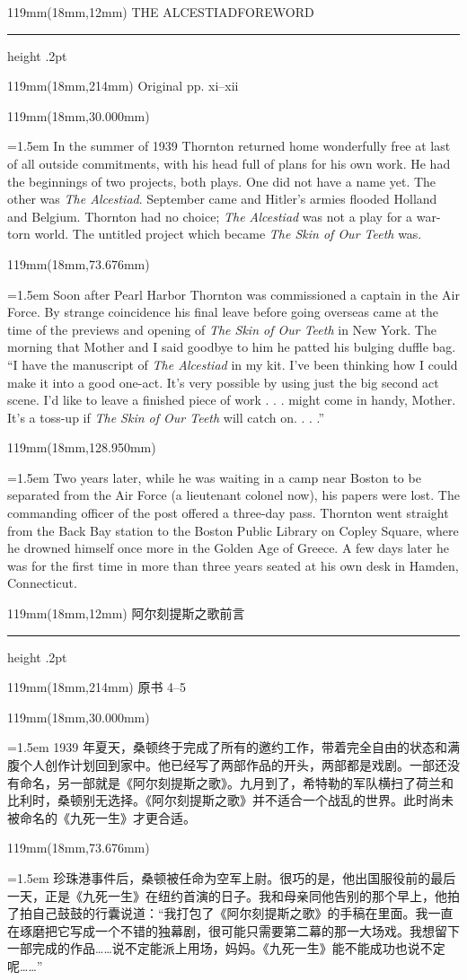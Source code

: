 \documentclass{article}
\newcommand{\ENsetup}{\normalfont\color{ink}\fontsize{11}{16.5}\selectfont\emergencystretch=1.5em}
\newcommand{\ZHsetup}{\normalfont\color{ink}\fontsize{10.5}{17}\selectfont\emergencystretch=1.5em}
\newcommand{\Block}[3]{\begin{textblock*}{119mm}(18mm,#1mm){#2 #3\par}\end{textblock*}}
\newcommand{\Heading}[3]{%
  \begin{textblock*}{119mm}(18mm,12mm)
    \color{quiet}\fontsize{7.5}{10}\selectfont
    #1\hfill #2\par\vspace{3mm}\hrule height .2pt
  \end{textblock*}
  \begin{textblock*}{119mm}(18mm,214mm)
    \color{quiet}\fontsize{7}{10}\selectfont #3\hfill\thepage
  \end{textblock*}
}
\begin{document}
\newpage
\null
\Heading{THE ALCESTIAD}{FOREWORD}{Original pp. xi–xii}
\Block{30.000}{\ENsetup}{In the summer of 1939 Thornton returned home wonderfully free at last of all outside commitments, with his head full of plans for his own work. He had the beginnings of two projects, both plays. One did not have a name yet. The other was \textit{The Alcestiad}. September came and Hitler's armies flooded Holland and Belgium. Thornton had no choice; \textit{The Alcestiad} was not a play for a war-torn world. The untitled project which became \textit{The Skin of Our Teeth} was.\par}
\Block{73.676}{\ENsetup}{Soon after Pearl Harbor Thornton was commissioned a captain in the Air Force. By strange coincidence his final leave before going overseas came at the time of the previews and opening of \textit{The Skin of Our Teeth} in New York. The morning that Mother and I said goodbye to him he patted his bulging duffle bag. ``I have the manuscript of \textit{The Alcestiad} in my kit. I've been thinking how I could make it into a good one-act. It's very possible by using just the big second act scene. I'd like to leave a finished piece of work . . . might come in handy, Mother. It's a toss-up if \textit{The Skin of Our Teeth} will catch on. . . .''\par}
\Block{128.950}{\ENsetup}{Two years later, while he was waiting in a camp near Boston to be separated from the Air Force (a lieutenant colonel now), his papers were lost. The commanding officer of the post offered a three-day pass. Thornton went straight from the Back Bay station to the Boston Public Library on Copley Square, where he drowned himself once more in the Golden Age of Greece. A few days later he was for the first time in more than three years seated at his own desk in Hamden, Connecticut.\par}
\newpage
\null
\Heading{阿尔刻提斯之歌}{前言}{原书 4–5}
\Block{30.000}{\ZHsetup}{1939 年夏天，桑顿终于完成了所有的邀约工作，带着完全自由的状态和满腹个人创作计划回到家中。他已经写了两部作品的开头，两部都是戏剧。一部还没有命名，另一部就是《阿尔刻提斯之歌》。九月到了，希特勒的军队横扫了荷兰和比利时，桑顿别无选择。《阿尔刻提斯之歌》并不适合一个战乱的世界。此时尚未被命名的《九死一生》才更合适。\par }
\Block{73.676}{\ZHsetup}{珍珠港事件后，桑顿被任命为空军上尉。很巧的是，他出国服役前的最后一天，正是《九死一生》在纽约首演的日子。我和母亲同他告别的那个早上，他拍了拍自己鼓鼓的行囊说道：“我打包了《阿尔刻提斯之歌》的手稿在里面。我一直在琢磨把它写成一个不错的独幕剧，很可能只需要第二幕的那一大场戏。我想留下一部完成的作品……说不定能派上用场，妈妈。《九死一生》能不能成功也说不定呢……”\par }
\end{document}
